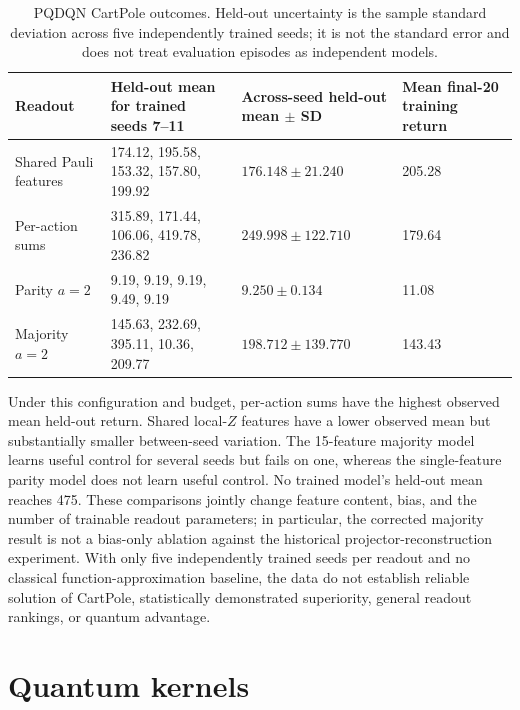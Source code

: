 \documentclass[10pt]{article}
\begin{document}
\begin{table}[t]
\centering
\caption{PQDQN CartPole outcomes.  Held-out uncertainty is the sample standard
deviation across five independently trained seeds; it is not the standard
error and does not treat evaluation episodes as independent models.}
\label{tab:pqdqn-cartpole-results}
\small
\begin{tabularx}{\textwidth}{@{}p{}X p{}p{}@{}}
\toprule
Readout & Held-out mean for trained seeds 7--11 & Across-seed held-out mean $\pm$ SD & Mean final-20 training return \\
\midrule
Shared Pauli features & 174.12, 195.58, 153.32, 157.80, 199.92 & $176.148\pm21.240$ & 205.28 \\
Per-action sums & 315.89, 171.44, 106.06, 419.78, 236.82 & $249.998\pm122.710$ & 179.64 \\
Parity $a=2$ & 9.19, 9.19, 9.19, 9.49, 9.19 & $9.250\pm0.134$ & 11.08 \\
Majority $a=2$ & 145.63, 232.69, 395.11, 10.36, 209.77 & $198.712\pm139.770$ & 143.43 \\
\bottomrule
\end{tabularx}
\end{table}

Under this configuration and budget, per-action sums have the highest observed
mean held-out return.  Shared local-$Z$ features have a lower observed mean but
substantially smaller between-seed variation.  The 15-feature majority model
learns useful control for several seeds but fails on one, whereas the
single-feature parity model does not learn useful control.  No trained model's
held-out mean reaches 475.  These comparisons jointly change feature content,
bias, and the number of trainable readout parameters; in particular, the
corrected majority result is not a bias-only ablation against the historical
projector-reconstruction experiment.  With only five independently trained
seeds per readout and no classical function-approximation baseline, the data do
not establish reliable solution of CartPole, statistically demonstrated
superiority, general readout rankings, or quantum advantage.


\section{Quantum kernels}
\label{sec:kernels}
\end{document}
